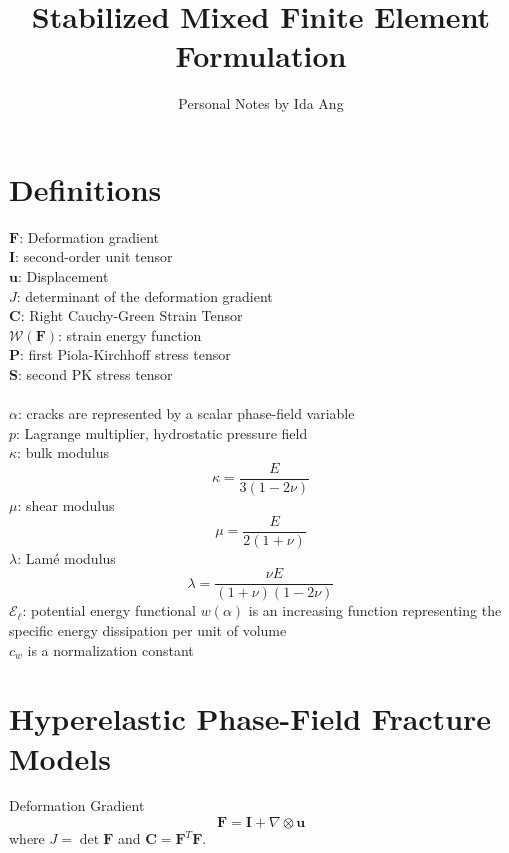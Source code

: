 \documentclass[12pt,3p]{article}
\numberwithin{equation}{section}
\begin{document}
\title{Stabilized Mixed Finite Element Formulation}
\author{Personal Notes by Ida Ang}
\maketitle

\section*{Definitions}
$\mathbf{F}$: Deformation gradient \\
$\mathbf{I}$: second-order unit tensor \\
$\bm{u}$: Displacement \\
$J$: determinant of the deformation gradient \\
$\mathbf{C}$: Right Cauchy-Green Strain Tensor \\
$\mathcal{W}(\mathbf{F})$: strain energy function \\
$\mathbf{P}$: first Piola-Kirchhoff stress tensor \\
$\mathbf{S}$: second PK stress tensor \\ \\
$\alpha$: cracks are represented by a scalar phase-field variable \\
$p$: Lagrange multiplier, hydrostatic pressure field \\
$\kappa$: bulk modulus 
\begin{equation}
\kappa = \frac{E}{3 (1 - 2 \nu)}
\end{equation}
$\mu$: shear modulus 
\begin{equation}
\mu = \frac{E}{2 (1 + \nu)}
\end{equation}
$\lambda$: Lamé modulus 
\begin{equation}
\lambda = \frac{\nu E}{(1+ \nu) (1 - 2 \nu)}
\end{equation}
$\mathcal{E}_\ell$: potential energy functional 
$w(\alpha)$ is an increasing function representing the specific energy dissipation per unit of volume \\
$c_w$ is a normalization constant 

\section{Hyperelastic Phase-Field Fracture Models}
Deformation Gradient 
\begin{equation}\label{EqDefGrad}
\mathbf{F}=\mathbf{I}+\nabla\otimes\bm{u}
\end{equation}
where $J=\det \mathbf{F}$ and $\mathbf{C}=\mathbf{F}^T\mathbf{F}$.
\end{document}
